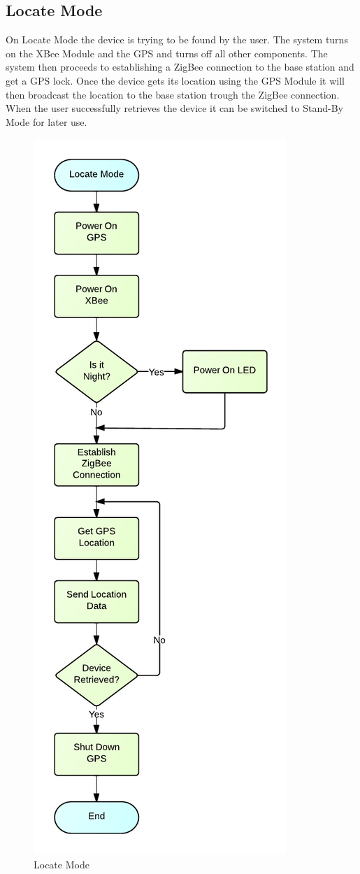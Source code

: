 \subsection{Locate Mode}
On Locate Mode the device is trying to be found by the user. The system turns on the XBee Module and the GPS and turns off all other components. The system then proceeds to establishing a ZigBee connection to the base station and get a GPS lock. Once the device gets its location using the GPS Module it will then broadcast the location to the base station trough the ZigBee connection. When the user successfully retrieves the device it can be switched to Stand-By Mode for later use.
\begin{figure}[H]
	\centering
	\includegraphics[scale=1.0]{img/LocateMode}
	\caption{Locate Mode \label{fig:locateMode}}
\end{figure}

